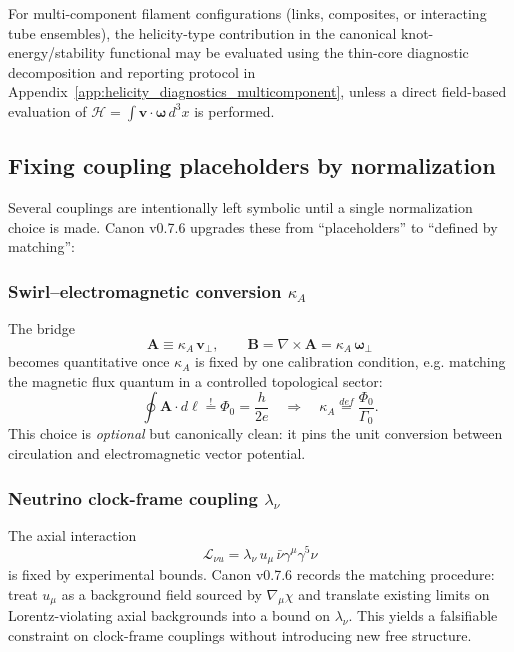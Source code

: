 \documentclass[10pt]{article}
\begin{document}
For multi-component filament configurations (links, composites, or interacting tube ensembles), the helicity-type contribution in the canonical knot-energy/stability functional may be evaluated using the thin-core diagnostic decomposition and reporting protocol in Appendix~\ref{app:helicity_diagnostics_multicomponent}, unless a direct field-based evaluation of $\mathcal{H}=\int \mathbf{v}\cdot\boldsymbol{\omega}\,d^3x$ is performed.

\subsection{Fixing coupling placeholders by normalization}
\label{sec:coupling_normalization}

Several couplings are intentionally left symbolic until a single normalization
choice is made. Canon v0.7.6 upgrades these from ``placeholders'' to ``defined by
matching'':

\subsubsection{Swirl--electromagnetic conversion $\kappa_A$}
The bridge
\begin{equation}
\mathbf{A}\equiv \kappa_A\,\mathbf{v}_\perp,\qquad
\mathbf{B}=\nabla\times\mathbf{A}=\kappa_A\,\boldsymbol{\omega}_\perp
\end{equation}
becomes quantitative once $\kappa_A$ is fixed by one calibration condition, e.g.
matching the magnetic flux quantum in a controlled topological sector:
\begin{equation}
\oint \mathbf{A}\cdot d\boldsymbol{\ell} \stackrel{!}{=} \Phi_0=\frac{h}{2e}
\quad\Rightarrow\quad
\kappa_A \stackrel{def}{=}\frac{\Phi_0}{\Gamma_0}.
\end{equation}
This choice is \emph{optional} but canonically clean: it pins the unit
conversion between circulation and electromagnetic vector potential.

\subsubsection{Neutrino clock-frame coupling $\lambda_\nu$}
The axial interaction
\begin{equation}
\mathcal{L}_{\nu u}=\lambda_\nu\,u_\mu\,\bar{\nu}\gamma^\mu\gamma^5\nu
\end{equation}
is fixed by experimental bounds. Canon v0.7.6 records the matching procedure:
treat $u_\mu$ as a background field sourced by $\nabla_\mu\chi$ and translate existing
limits on Lorentz-violating axial backgrounds into a bound on $\lambda_\nu$.
This yields a falsifiable constraint on clock-frame couplings without introducing
new free structure.
\end{document}
